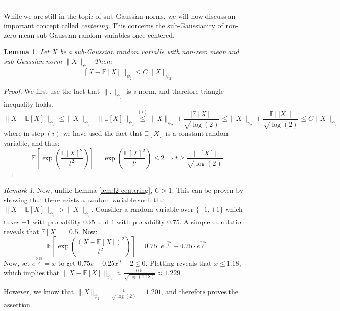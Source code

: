 \documentclass{article}
\newtheorem{lemma}{Lemma}[subsection]
\theoremstyle{remark}
\newtheorem*{remark}{Remark}
\newcommand{\comprule}{\textcolor[RGB]{220,220,220}{\rule{\linewidth}{0.2pt}}}
\newcommand{\Exp}{\mathbb{E}}
\begin{document}
\comprule

While we are still in the topic of sub-Gaussian norms, we will now discuss an important concept called \emph{centering}. This concerns the sub-Gaussianity of non-zero mean sub-Gaussian random variables once centered.

\begin{lemma}
\label{lem:centering}
Let \(X\) be a sub-Gaussian random variable with non-zero mean and sub-Gaussian norm \(\|X\|_{\psi_{2}}\). Then:
\begin{equation*}
\|X - \Exp[X]\|_{\psi_{2}} \leq C\|X\|_{\psi_{2}}
\end{equation*}
\end{lemma}

\begin{proof}
We first use the fact that \(\|.\|_{\psi_{2}}\) is a norm, and therefore triangle inequality holds.
\begin{equation*}
\|X - \Exp[X]\|_{\psi_{2}} \leq \|X\|_{\psi_{2}} + \|\Exp[X]\|_{\psi_{2}} \overset{(i)}\leq \|X\|_{\psi_{2}} + \frac{|\Exp[X]|}{\sqrt{\log(2)}} \leq \|X\|_{\psi_{2}} + \frac{\Exp[|X|]}{\sqrt{\log(2)}} \leq C\|X\|_{\psi_{2}}
\end{equation*}
where in step \((i)\) we have used the fact that \(\Exp[X]\) is a constant random variable, and thus:
\begin{equation*}
\Exp\left[\exp\left(\frac{\Exp[X]^{2}}{t^{2}}\right)\right] = \exp\left(\frac{\Exp[X]^{2}}{t^{2}}\right) \leq 2 \Rightarrow t \geq \frac{|\Exp[X]|}{\sqrt{\log(2)}}
\end{equation*}
\end{proof}

\begin{remark}
Now, unlike Lemma \ref{lem:l2-centering}, \(C > 1\). This can be proven by showing that there exists a random variable such that \(\|X - \Exp[X]\|_{\psi_{2}} > \|X\|_{\psi_{2}}\). Consider a random variable over \(\{-1, +1\}\) which takes \(-1\) with probability \(0.25\) and \(1\) with probability \(0.75\). A simple calculation reveals that \(\Exp[X] = 0.5\). Now:
\begin{equation*}
\Exp\left[\exp\left(\frac{(X - \Exp[X])^{2}}{t^{2}}\right)\right] = 0.75 \cdot e^{\frac{0.25}{t^{2}}} + 0.25 \cdot e^{\frac{2.25}{t^{2}}}
\end{equation*}
Now, set \(e^{\frac{0.25}{t^{2}}} = x\) to get \(0.75x + 0.25x^{9} - 2 \leq 0\). Plotting reveals that \(x \leq 1.18\), which implies that \(\|X - \Exp[X]\|_{\psi_{2}} \approx \frac{0.5}{\sqrt{\log(1.18)}} \approx 1.229\).

However, we know that \(\|X\|_{\psi_{2}} = \frac{1}{\sqrt{\log(2)}} = 1.201\), and therefore proves the assertion.
\end{remark}
\end{document}
